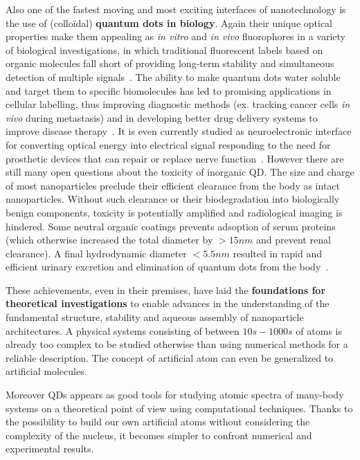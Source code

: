 Also one of the fastest moving and most exciting interfaces of nanotechnology is the use of (collo\"idal) \textbf{quantum dots in biology}. Again their unique optical properties make them appealing as \textit{in vitro} and \textit{in vivo} fluorophores in a variety of biological investigations, in which traditional fluorescent labels based on organic molecules fall short of providing long-term stability and simultaneous detection of multiple signals~\cite{Medintz2005}. The ability to make quantum dots water soluble and target them to specific biomolecules has led to promising applications in cellular labelling, thus improving diagnostic methods (ex. tracking cancer cells \textit{in vivo} during metastasis\cite{Gao2004,Hoshino2004,Voura12004}) and in developing better drug delivery systems to improve disease therapy~\cite{Kralj2003}. It is even currently studied as neuroelectronic interface for converting optical energy into electrical signal responding to the need for prosthetic devices that can repair or replace nerve function~\cite{Winter2004}.
However there are still many open questions about the toxicity of inorganic QD. The size and charge of most nanoparticles preclude their efficient clearance from the body as intact nanoparticles. Without such clearance or their biodegradation into biologically benign components, toxicity is potentially amplified and radiological imaging is hindered. Some neutral organic coatings prevents adsoption of serum proteins (which otherwise increased the total diameter by $>15nm$ and prevent renal clearance). A final hydrodynamic diameter $<5.5nm$ resulted in rapid and efficient urinary excretion and elimination of quantum dots from the body~\cite{Soo2007}.


These achievements, even in their premises, have laid the \textbf{foundations for theoretical investigations} to enable advances in the understanding of the fundamental structure, stability and aqueous assembly of nanoparticle architectures. A physical systems consisting of between $10s-1000s$ of atoms is already too complex to be studied otherwise than using numerical methods for a reliable description. The concept of artificial atom can even be generalized to artificial molecules.

Moreover QDs appears as good tools for studying atomic spectra of many-body systems on a theoretical point of view using computational techniques. Thanks to the possibility to build our own artificial atoms without considering the complexity of the nucleus, it becomes simpler to confront numerical and experimental results. 



